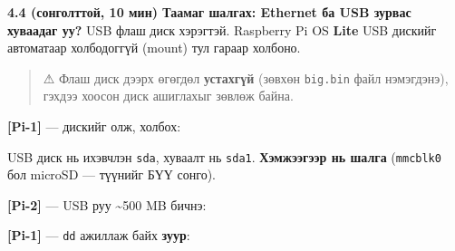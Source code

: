 \textbf{4.4 (сонголттой, 10 мин) Таамаг шалгах: Ethernet ба USB зурвас хуваадаг уу?} USB флаш диск хэрэгтэй. Raspberry Pi OS \textbf{Lite} USB дискийг автоматаар холбодоггүй (mount) тул гараар холбоно.

\begin{quote}
⚠ Флаш диск дээрх өгөгдөл \textbf{устахгүй} (зөвхөн \texttt{big.bin} файл нэмэгдэнэ), гэхдээ хоосон диск ашиглахыг зөвлөж байна.
\end{quote}

\textbf{{[}Pi-1{]}} --- дискийг олж, холбох:

\begin{Shaded}
\begin{Highlighting}[]
\end{Highlighting}
\end{Shaded}

USB диск нь ихэвчлэн \texttt{sda}, хуваалт нь \texttt{sda1}. \textbf{Хэмжээгээр нь шалга} (\texttt{mmcblk0} бол microSD --- түүнийг БҮҮ сонго).

\begin{Shaded}
\begin{Highlighting}[]
\end{Highlighting}
\end{Shaded}

\textbf{{[}Pi-2{]}} --- USB руу \textasciitilde500 MB бичнэ:

\begin{Shaded}
\begin{Highlighting}[]
\end{Highlighting}
\end{Shaded}

\textbf{{[}Pi-1{]}} --- \texttt{dd} ажиллаж байх \textbf{зуур}:

\begin{Shaded}
\begin{Highlighting}[]
  \KeywordTok{\textbackslash{}}
\end{Highlighting}
\end{Shaded}

